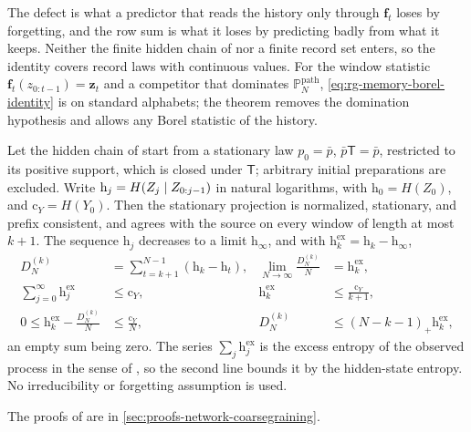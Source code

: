 The defect is what a predictor that reads the history only through $\mathbf f_t$
loses by forgetting, and the row sum is what it loses by predicting badly from what it
keeps. Neither the finite hidden chain of  nor a
finite record set enters, so the identity covers record laws with continuous values.
For the window statistic $\mathbf f_t(z_{0:t-1})=\mathbf z_t$ and a competitor that dominates
$\mathbb P^{\mathrm{path}}_N$, \eqref{eq:rg-memory-borel-identity} is
\citet[Sec.~7.3, Theorem~7.3.1, Eqs.~(7.13) and (7.16)]{Gray1990EIT} on standard alphabets; the
theorem removes the domination hypothesis and allows any Borel statistic of the history.

Let the hidden chain of  start from a stationary law
$p_0=\bar p$, $\bar p\mathsf T=\bar p$, restricted to its positive support, which is
closed under $\mathsf T$; arbitrary initial preparations are excluded. Write
$\mathrm h_j=H(Z_j\mid Z_{0:j-1})$ in natural logarithms, with
$\mathrm h_0=H(Z_0)$, and $\mathrm c_Y=H(Y_0)$. Then the stationary projection is
normalized, stationary, and prefix consistent, and agrees with the source on every
window of length at most $k+1$. The sequence $\mathrm h_j$ decreases to a limit
$\mathrm h_\infty$, and with $\mathrm h^{\mathrm{ex}}_k=\mathrm h_k-\mathrm h_\infty$,
\begin{equation}
\begin{aligned}
D^{(k)}_N&=\sum_{t=k+1}^{N-1}(\mathrm h_k-\mathrm h_t),
&\lim_{N\to\infty}\frac{D^{(k)}_N}N&=\mathrm h^{\mathrm{ex}}_k,\\
\sum_{j=0}^\infty\mathrm h^{\mathrm{ex}}_j&\le\mathrm c_Y,
&\mathrm h^{\mathrm{ex}}_k&\le\frac{\mathrm c_Y}{k+1},\\
0\le\mathrm h^{\mathrm{ex}}_k-\frac{D^{(k)}_N}N&\le\frac{\mathrm c_Y}N,
&D^{(k)}_N&\le(N-k-1)_+\mathrm h^{\mathrm{ex}}_k,
\end{aligned}
\label{eq:rg-memory-duration-identities}
\end{equation}
an empty sum being zero. The series $\sum_j\mathrm h^{\mathrm{ex}}_j$ is the excess
entropy of the observed process in the sense of \citet{CrutchfieldFeldman2003}, so the
second line bounds it by the hidden-state entropy. No irreducibility or forgetting
assumption is used. 

The proofs of
are in \cref{sec:proofs-network-coarsegraining}.

